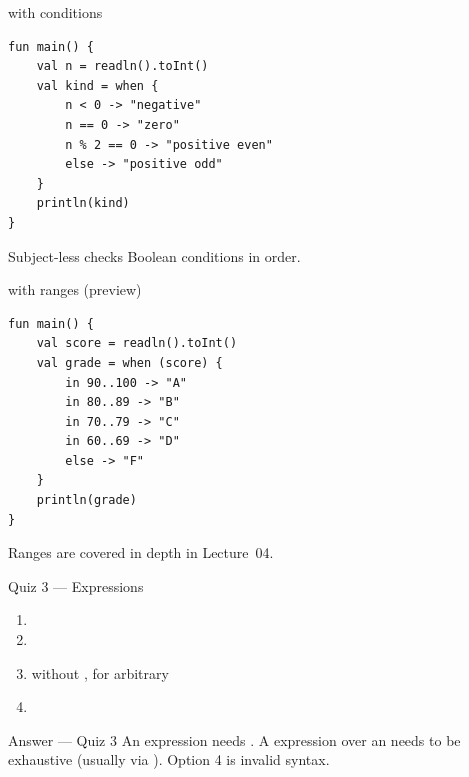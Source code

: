 \documentclass[aspectratio=169,11pt]{beamer}
\begin{document}
    \begin{frame}[fragile]{ with conditions}
        \begin{lstlisting}
fun main() {
    val n = readln().toInt()
    val kind = when {
        n < 0 -> "negative"
        n == 0 -> "zero"
        n % 2 == 0 -> "positive even"
        else -> "positive odd"
    }
    println(kind)
}
        \end{lstlisting}
        Subject-less  checks Boolean conditions in order.
    \end{frame}

    \begin{frame}[fragile]{ with ranges (preview)}
        \begin{lstlisting}
fun main() {
    val score = readln().toInt()
    val grade = when (score) {
        in 90..100 -> "A"
        in 80..89 -> "B"
        in 70..79 -> "C"
        in 60..69 -> "D"
        else -> "F"
    }
    println(grade)
}
        \end{lstlisting}
        Ranges are covered in depth in Lecture~04.
    \end{frame}

    \begin{frame}{Quiz 3 --- Expressions}
        \begin{enumerate}
            \item {}
            \item {}
            \item {}
              without , for arbitrary 
            \item {}
        \end{enumerate}
        \quizpause
    \end{frame}

    \begin{frame}{Answer --- Quiz 3}
        \vspace{0.4em}
        An  expression needs .
        A  expression over an  needs to be exhaustive
        (usually via ). Option 4 is invalid syntax.
    \end{frame}
\end{document}
